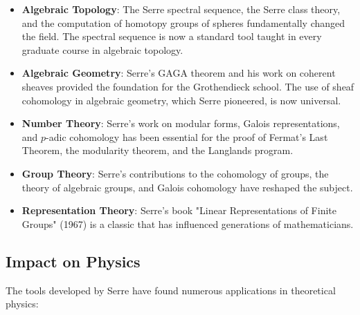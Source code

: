 \begin{itemize}
\item \textbf{Algebraic Topology}: The Serre spectral sequence, the Serre class theory, and the computation of homotopy groups of spheres fundamentally changed the field. The spectral sequence is now a standard tool taught in every graduate course in algebraic topology.

\item \textbf{Algebraic Geometry}: Serre's GAGA theorem and his work on coherent sheaves provided the foundation for the Grothendieck school. The use of sheaf cohomology in algebraic geometry, which Serre pioneered, is now universal.

\item \textbf{Number Theory}: Serre's work on modular forms, Galois representations, and $p$-adic cohomology has been essential for the proof of Fermat's Last Theorem, the modularity theorem, and the Langlands program.

\item \textbf{Group Theory}: Serre's contributions to the cohomology of groups, the theory of algebraic groups, and Galois cohomology have reshaped the subject.

\item \textbf{Representation Theory}: Serre's book "Linear Representations of Finite Groups" (1967) is a classic that has influenced generations of mathematicians.
\end{itemize}

\subsection{Impact on Physics}

The tools developed by Serre have found numerous applications in theoretical physics:

